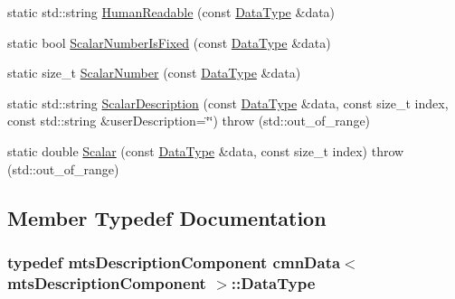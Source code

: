 \begin{DoxyCompactItemize}
\item 
static std\-::string \hyperlink{classcmn_data_3_01mts_description_component_01_4_a88c644a8faaae981d6022c3f49fc9ca8}{Human\-Readable} (const \hyperlink{classcmn_data_3_01mts_description_component_01_4_a5b51d26c4705dfe39a45243a2a4023dc}{Data\-Type} \&data)
\item 
static bool \hyperlink{classcmn_data_3_01mts_description_component_01_4_aaddf12ff6b535a9956ba1302147c38e4}{Scalar\-Number\-Is\-Fixed} (const \hyperlink{classcmn_data_3_01mts_description_component_01_4_a5b51d26c4705dfe39a45243a2a4023dc}{Data\-Type} \&data)
\item 
static size\-\_\-t \hyperlink{classcmn_data_3_01mts_description_component_01_4_af743501c375275321e68858d5fb948b4}{Scalar\-Number} (const \hyperlink{classcmn_data_3_01mts_description_component_01_4_a5b51d26c4705dfe39a45243a2a4023dc}{Data\-Type} \&data)
\item 
static std\-::string \hyperlink{classcmn_data_3_01mts_description_component_01_4_aecd6f8ffa46d9dfb7e64c053ee3c3c0e}{Scalar\-Description} (const \hyperlink{classcmn_data_3_01mts_description_component_01_4_a5b51d26c4705dfe39a45243a2a4023dc}{Data\-Type} \&data, const size\-\_\-t index, const std\-::string \&user\-Description=\char`\"{}\char`\"{})  throw (std\-::out\-\_\-of\-\_\-range)
\item 
static double \hyperlink{classcmn_data_3_01mts_description_component_01_4_a844ebabfa4cfc58e964c42a2fcf308c6}{Scalar} (const \hyperlink{classcmn_data_3_01mts_description_component_01_4_a5b51d26c4705dfe39a45243a2a4023dc}{Data\-Type} \&data, const size\-\_\-t index)  throw (std\-::out\-\_\-of\-\_\-range)
\end{DoxyCompactItemize}


\subsection{Member Typedef Documentation}
\hypertarget{classcmn_data_3_01mts_description_component_01_4_a5b51d26c4705dfe39a45243a2a4023dc}{
\subsubsection[{Data\-Type}]{\setlength{\rightskip}{0pt plus 5cm}typedef {\bf mts\-Description\-Component} {\bf cmn\-Data}$<$ {\bf mts\-Description\-Component} $>$\-::{\bf Data\-Type}}}\label{classcmn_data_3_01mts_description_component_01_4_a5b51d26c4705dfe39a45243a2a4023dc}


